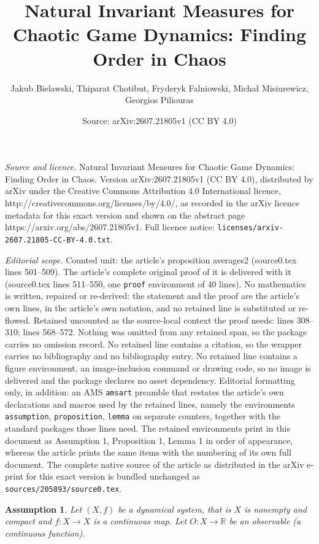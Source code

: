 \documentclass[10pt,a4paper]{amsart}
\title{Natural Invariant Measures for Chaotic Game Dynamics: Finding Order in Chaos}
\author{Jakub Bielawski, Thiparat Chotibut, Fryderyk Falniowski, Micha{\l} Misiurewicz, Georgios Piliouras}
\date{Source: arXiv:2607.21805v1 (CC BY 4.0)}
\newtheorem{assumption}{Assumption}
\def\R{\ensuremath{\mathbb{R}}}
\begin{document}
\maketitle

\noindent\emph{Source and licence.} Natural Invariant Measures for Chaotic Game Dynamics: Finding Order in Chaos. Version arXiv:2607.21805v1 (CC BY 4.0), distributed by arXiv under the Creative Commons Attribution 4.0 International licence, http://creativecommons.org/licenses/by/4.0/, as recorded in the arXiv licence metadata for this exact version and shown on the abstract page https://arxiv.org/abs/2607.21805v1. Full licence notice: \texttt{licenses/arxiv-2607.21805-CC-BY-4.0.txt}.\par\smallskip

\noindent\textit{Editorial scope.} Counted unit: the article's proposition averages2 (source0.tex lines 501--509). The article's complete original proof of it is delivered with it (source0.tex lines 511--550, one \texttt{proof} environment of 40 lines). No mathematics is written, repaired or re-derived: the statement and the proof are the article's own lines, in the article's own notation, and no retained line is substituted or re-flowed.  Retained uncounted as the source-local context the proof needs: lines 308--310; lines 568--572.  Nothing was omitted from any retained span, so the package carries no omission record.  No retained line contains a citation, so the wrapper carries no bibliography and no bibliography entry.  No retained line contains a figure environment, an image-inclusion command or drawing code, so no image is delivered and the package declares no asset dependency.  Editorial formatting only, in addition: an AMS \texttt{amsart} preamble that restates the article's own declarations and macros used by the retained lines, namely the environments \texttt{assumption}, \texttt{proposition}, \texttt{lemma} on separate counters, together with the standard packages those lines need.  The retained environments print in this document as Assumption 1, Proposition 1, Lemma 1 in order of appearance, whereas the article prints the same items with the numbering of its own full document.  The complete native source of the article as distributed in the arXiv e-print for this exact version is bundled unchanged as \texttt{sources/205893/source0.tex}.
\begin{assumption}\label{as1}
Let $(X,f)$ be a dynamical system, that is $X$ is nonempty and compact and $f\colon X \to X$ is a continuous map. Let $O\colon X\to\R$ be an observable (a continuous function).
\end{assumption}
\end{document}
